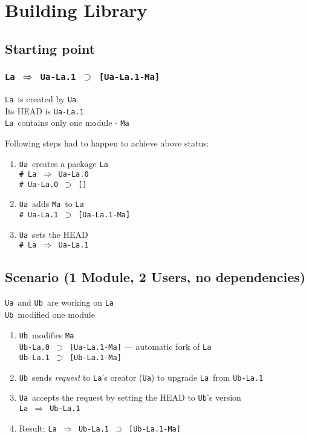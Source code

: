 \documentclass[10pt]{article}
\def\Ua{{\tt Ua}}
\def\Ub{{\tt Ub}}
\def\La{{\tt La}}
\def\Ma{{\tt Ma}}
\def\headsto{${\Longrightarrow}$ }
\def\hto{\headsto}
\def\eq{${\supset}$ }
\begin{document}
\section{Building Library}

	\subsection{Starting point}

		\subsubsection*{{\tt La \hto  Ua-La.1 \eq [Ua-La.1-Ma]}}
			\La\ is created by \Ua.\\
			Its HEAD is {\tt Ua-La.1}\\
			\La\ contains only one module - \Ma
			
			\pagebreak
			\noindent Following steps had to happen to achieve above status:
			\begin{enumerate}
				\item{\Ua\ creates a package \La\\
				    {\tt \# La \hto  Ua-La.0} \\
				    {\tt \# Ua-La.0 \eq []}
				}
				\item{\Ua\ adds \Ma\ to \La\\
					{\tt \# Ua-La.1 \eq [Ua-La.1-Ma]}
				}
				\item{\Ua\ sets the HEAD\\
					{\tt \# La \hto  Ua-La.1}
				}
			\end{enumerate}
			
	\subsection{Scenario (1 Module, 2 Users, no dependencies)}
		\Ua\ and \Ub\ are working on \La\\
		\Ub\ modified one module

		\begin{enumerate}
			\item{\Ub\ modifies \Ma\\
            		{\tt Ub-La.0 \eq [Ua-La.1-Ma]} --- automatic fork of \La\\
				{\tt Ub-La.1 \eq [Ub-La.1-Ma]}
			}
			\item{\Ub\ sends {\em request} to \La's creator (\Ua) to upgrade \La\ from {\tt Ub-La.1}}
			\item{\Ua\ accepts the request by setting the HEAD to \Ub's version\\
				{\tt La \hto  Ub-La.1}
			}
			\item{Result: {\tt La \hto  Ub-La.1 \eq [Ub-La.1-Ma]}}
		\end{enumerate}
\end{document}
